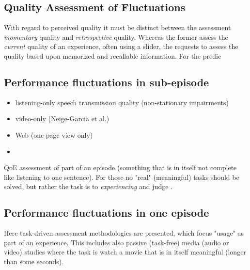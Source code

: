 \subsection{Quality Assessment of Fluctuations}
With regard to perceived quality it must be distinct between the assessment \emph{momentary} quality and \emph{retrospective} quality.
Whereas the former assess the \emph{current} quality of an experience, often using a slider, the requests to assess the quality based upon memorized and recallable information.
For the predic



























\subsection{Performance fluctuations in sub-episode}
\begin{itemize}
\item listening-only speech transmission quality (non-stationary impairments)
\item video-only (Neige-Garcia et al.)
\item Web (one-page view only)
\item \cite{hands_recency_2001}
\end{itemize}

\cite{garcia_parametric_2014}


QoE assessment of part of an episode (something that is in itself not complete like listening to one sentence).
For those no "real" (meaningful) tasks should be solved, but rather the task is to \textit{experiencing} and judge \cite{egger_qoe_2014}.

\subsection{Performance fluctuations in one episode}
Here task-driven assessment methodologies are presented, which focus "usage" as part of an experience.
This includes also passive (task-free) media (audio or video) studies where the task is watch a movie that is in itself meaningful (longer than some seconds).

